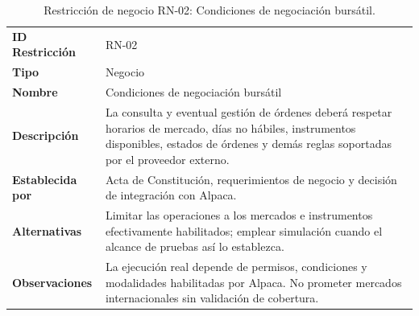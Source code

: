 \documentclass[11pt,a4paper,oneside]{article}
\begin{document}
\begingroup
\small
\setlength{\tabcolsep}{7pt}
\renewcommand{\arraystretch}{1.30}
\setlength{\anchoRegistro}{\dimexpr\textwidth-4\tabcolsep-3\arrayrulewidth\relax}
\begin{table}[H]
\centering
\caption{Restricción de negocio RN-02: Condiciones de negociación bursátil.}
\label{tab:restriccion-rn-02}
\begin{tabular}{|
>{\RaggedRight\arraybackslash}p{.28\anchoRegistro}|
>{\RaggedRight\arraybackslash}p{.72\anchoRegistro}|}
\hline
\rowcolor{negroTabla}
\multicolumn{2}{|l|}{\color{white}\bfseries Registro de Restricción de Negocio}\\\hline
\cellcolor{azulTabla}\bfseries ID Restricción
& RN-02\\\hline
\cellcolor{azulTabla}\bfseries Tipo
& Negocio\\\hline
\cellcolor{azulTabla}\bfseries Nombre
& Condiciones de negociación bursátil\\\hline
\cellcolor{azulTabla}\bfseries Descripción
& La consulta y eventual gestión de órdenes deberá respetar horarios de mercado, días no hábiles, instrumentos disponibles, estados de órdenes y demás reglas soportadas por el proveedor externo.\\\hline
\cellcolor{azulTabla}\bfseries Establecida por
& Acta de Constitución, requerimientos de negocio y decisión de integración con Alpaca.\\\hline
\cellcolor{azulTabla}\bfseries Alternativas
& Limitar las operaciones a los mercados e instrumentos efectivamente habilitados; emplear simulación cuando el alcance de pruebas así lo establezca.\\\hline
\cellcolor{azulTabla}\bfseries Observaciones
& La ejecución real depende de permisos, condiciones y modalidades habilitadas por Alpaca. No prometer mercados internacionales sin validación de cobertura.\\\hline
\end{tabular}
\end{table}
\endgroup
\end{document}
